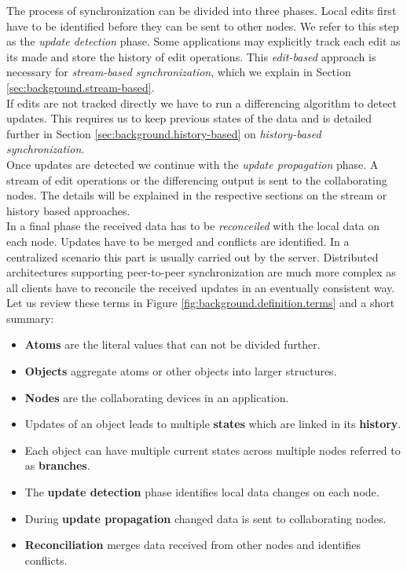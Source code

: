 The process of synchronization can be divided into three phases.
Local edits first have to be identified before they can be sent to other nodes.
We refer to this step as the \emph{update detection} phase.
Some applications may explicitly track each edit as its made and store the history of edit operations.
This \emph{edit-based} approach is necessary for \emph{stream-based synchronization}, which we explain in Section \ref{sec:background.stream-based}.\\
If edits are not tracked directly we have to run a differencing algorithm to detect updates.
This requires us to keep previous states of the data and is detailed further in Section \ref{sec:background.history-based} on \emph{history-based synchronization}.\\
Once updates are detected we continue with the \emph{update propagation} phase.
A stream of edit operations or the differencing output is sent to the collaborating nodes.
The details will be explained in the respective sections on the stream or history based approaches.\\
In a final phase the received data has to be \emph{reconceiled} with the local data on each node.
Updates have to be merged and conflicts are identified.
In a centralized scenario this part is usually carried out by the server.
Distributed architectures supporting peer-to-peer synchronization are much more complex as all clients have to reconcile the received updates in an eventually consistent way.\\

Let us review these terms in Figure \ref{fig:background.definition.terms} and a short summary:

\begin{itemize}
\item \textbf{Atoms} are the literal values that can not be divided further.
\item \textbf{Objects} aggregate atoms or other objects into larger structures.
\item \textbf{Nodes} are the collaborating devices in an application.
\item Updates of an object leads to multiple \textbf{states} which are linked in its \textbf{history}.
\item Each object can have multiple current states across multiple nodes referred to as \textbf{branches}.
\item The \textbf{update detection} phase identifies local data changes on each node.
\item During \textbf{update propagation} changed data is sent to collaborating nodes.
\item \textbf{Reconciliation} merges data received from other nodes and identifies conflicts.
\end{itemize}

